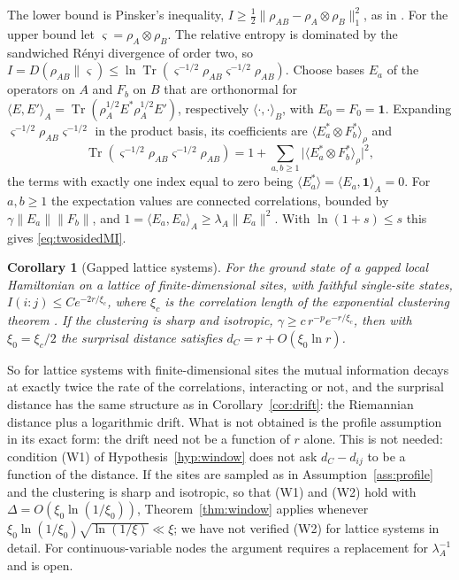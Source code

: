 \documentclass[11pt,a4paper]{article}
\makeatletter
\theoremstyle{stmt}
\newtheorem{corollary}[theorem]{Corollary}
\theoremstyle{defn}
\theoremstyle{rmk}
\renewenvironment{proof}[1][\proofname]{\par\pushQED{\qed}\normalfont\topsep6\p@\@plus6\p@\relax
  \trivlist\item[\hskip\labelsep{\sffamily\itshape\small #1.}]\ignorespaces}{\popQED\endtrivlist\@endpefalse}
\numberwithin{equation}{section}
\DeclareMathOperator{\Tr}{Tr}
\makeatother
\begin{document}
\begin{proof}
The lower bound is Pinsker's inequality, $I\ge\tfrac12\|\rho_{AB}-\rho_A\otimes\rho_B\|_1^2$, as in \cite{WVHC}. For the upper bound let $\varsigma=\rho_A\otimes\rho_B$. The relative entropy is dominated by the sandwiched R\'enyi divergence of order two, so $I=D(\rho_{AB}\|\varsigma)\le\ln\Tr(\varsigma^{-1/2}\rho_{AB}\varsigma^{-1/2}\rho_{AB})$. Choose bases $E_a$ of the operators on $A$ and $F_b$ on $B$ that are orthonormal for $\langle E,E'\rangle_A=\Tr(\rho_A^{1/2}E^*\rho_A^{1/2}E')$, respectively $\langle\cdot,\cdot\rangle_B$, with $E_0=F_0=\mathbf 1$. Expanding $\varsigma^{-1/2}\rho_{AB}\varsigma^{-1/2}$ in the product basis, its coefficients are $\langle E_a^*\otimes F_b^*\rangle_\rho$ and
\[
\Tr(\varsigma^{-1/2}\rho_{AB}\varsigma^{-1/2}\rho_{AB})=1+\sum_{a,b\ge1}\big|\langle E_a^*\otimes F_b^*\rangle_\rho\big|^2 ,
\]
the terms with exactly one index equal to zero being $\langle E_a^*\rangle=\langle E_a,\mathbf 1\rangle_A=0$. For $a,b\ge1$ the expectation values are connected correlations, bounded by $\gamma\|E_a\|\|F_b\|$, and $1=\langle E_a,E_a\rangle_A\ge\lambda_A\|E_a\|^2$. With $\ln(1+s)\le s$ this gives \eqref{eq:twosidedMI}.
\end{proof}

\begin{corollary}[Gapped lattice systems]\label{cor:gapped}
For the ground state of a gapped local Hamiltonian on a lattice of finite-dimensional sites, with faithful single-site states, $I(i:j)\le Ce^{-2r/\xi_c}$, where $\xi_c$ is the correlation length of the exponential clustering theorem \cite{HastingsKoma}. If the clustering is sharp and isotropic, $\gamma\ge c\,r^{-p}e^{-r/\xi_c}$, then with $\xi_0=\xi_c/2$ the surprisal distance satisfies $d_C=r+O(\xi_0\ln r)$.
\end{corollary}

So for lattice systems with finite-dimensional sites the mutual information decays at exactly twice the rate of the correlations, interacting or not, and the surprisal distance has the same structure as in Corollary~\ref{cor:drift}: the Riemannian distance plus a logarithmic drift. What is not obtained is the profile assumption in its exact form: the drift need not be a function of $r$ alone. This is not needed: condition (W1) of Hypothesis~\ref{hyp:window} does not ask $d_C-d_{ij}$ to be a function of the distance. If the sites are sampled as in Assumption~\ref{ass:profile} and the clustering is sharp and isotropic, so that (W1) and (W2) hold with $\Delta=O(\xi_0\ln(1/\xi_0))$, Theorem~\ref{thm:window} applies whenever $\xi_0\ln(1/\xi_0)\sqrt{\ln(1/\xi)}\ll\xi$; we have not verified (W2) for lattice systems in detail. For continuous-variable nodes the argument requires a replacement for $\lambda_A^{-1}$ and is open.
\end{document}
